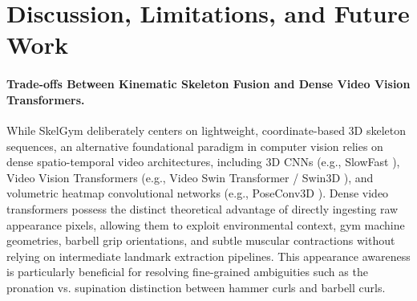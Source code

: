 \documentclass[preprint,12pt]{elsarticle}
\begin{document}
\section{Discussion, Limitations, and Future Work}

\paragraph{Trade-offs Between Kinematic Skeleton Fusion and Dense Video Vision Transformers.} 
While SkelGym deliberately centers on lightweight, coordinate-based 3D skeleton sequences, an alternative foundational paradigm in computer vision relies on dense spatio-temporal video architectures, including 3D CNNs (e.g., SlowFast \cite{feichtenhofer2019}), Video Vision Transformers (e.g., Video Swin Transformer / Swin3D \cite{liu2022video}), and volumetric heatmap convolutional networks (e.g., PoseConv3D \cite{duan2022}). Dense video transformers possess the distinct theoretical advantage of directly ingesting raw appearance pixels, allowing them to exploit environmental context, gym machine geometries, barbell grip orientations, and subtle muscular contractions without relying on intermediate landmark extraction pipelines. This appearance awareness is particularly beneficial for resolving fine-grained ambiguities such as the pronation vs. supination distinction between hammer curls and barbell curls.
\end{document}
